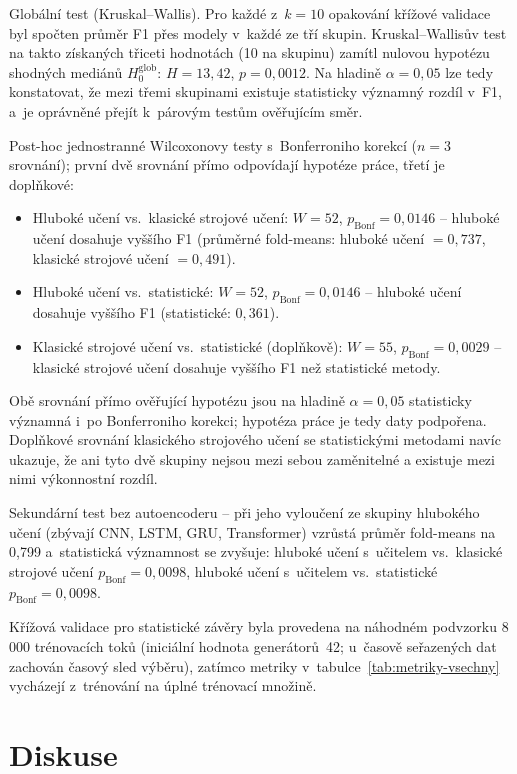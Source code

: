 Globální test (Kruskal--Wallis). Pro každé z~$k=10$ opakování křížové validace byl spočten průměr F1 přes modely v~každé ze tří skupin. Kruskal--Wallisův test na takto získaných třiceti hodnotách (10 na skupinu) zamítl nulovou hypotézu shodných mediánů $H_0^{\mathrm{glob}}$: $H = 13{,}42$, $p = 0{,}0012$. Na hladině $\alpha = 0{,}05$ lze tedy konstatovat, že mezi třemi skupinami existuje statisticky významný rozdíl v~F1, a~je oprávněné přejít k~párovým testům ověřujícím směr.

Post-hoc jednostranné Wilcoxonovy testy s~Bonferroniho korekcí ($n = 3$ srovnání); první dvě srovnání přímo odpovídají hypotéze práce, třetí je doplňkové:
\begin{itemize}
\item Hluboké učení vs.~klasické strojové učení: $W = 52$, $p_{\mathrm{Bonf}} = 0{,}0146$ -- hluboké učení dosahuje vyššího F1 (průměrné fold-means: hluboké učení $= 0{,}737$, klasické strojové učení $= 0{,}491$).
\item Hluboké učení vs.~statistické: $W = 52$, $p_{\mathrm{Bonf}} = 0{,}0146$ -- hluboké učení dosahuje vyššího F1 (statistické: $0{,}361$).
\item Klasické strojové učení vs.~statistické (doplňkově): $W = 55$, $p_{\mathrm{Bonf}} = 0{,}0029$ -- klasické strojové učení dosahuje vyššího F1 než statistické metody.
\end{itemize}
Obě srovnání přímo ověřující hypotézu jsou na hladině $\alpha = 0{,}05$ statisticky významná i~po Bonferroniho korekci; hypotéza práce je tedy daty podpořena. Doplňkové srovnání klasického strojového učení se statistickými metodami navíc ukazuje, že ani tyto dvě skupiny nejsou mezi sebou zaměnitelné a existuje mezi nimi výkonnostní rozdíl.

Sekundární test bez autoencoderu -- při jeho vyloučení ze skupiny hlubokého učení (zbývají CNN, LSTM, GRU, Transformer) vzrůstá průměr fold-means na 0{,}799 a~statistická významnost se zvyšuje: hluboké učení s~učitelem vs.~klasické strojové učení $p_{\mathrm{Bonf}} = 0{,}0098$, hluboké učení s~učitelem vs.~statistické $p_{\mathrm{Bonf}} = 0{,}0098$.

Křížová validace pro statistické závěry byla provedena na náhodném podvzorku 8\,000 trénovacích toků (iniciální hodnota generátorů~42; u~časově seřazených dat zachován časový sled výběru), zatímco metriky v~tabulce~\ref{tab:metriky-vsechny} vycházejí z~trénování na úplné trénovací množině.

\section{Diskuse}
\label{sec:diskuse}

